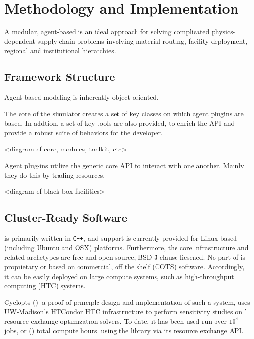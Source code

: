 \section{Methodology and Implementation}

A modular, agent-based is an ideal approach for solving complicated
physics-dependent supply chain problems involving material routing, facility
deployment, regional and institutional hierarchies.

\subsection{Framework Structure}

Agent-based modeling is inherently object oriented. 

The core of the simulator creates a set of key classes on which agent plugins 
are based. In addtion, a set of key tools are also provided, to enrich the API 
and provide a robust suite of behaviors for the developer.

<diagram of core, modules, toolkit, etc>

Agent plug-ins utilize the generic core API to interact with one another. 
Mainly they do this by trading resources. 

<diagram of black box facilities>

\subsection{Cluster-Ready Software}

\Cyclus is primarily written in \texttt{C++}, and support is currently provided
for Linux-based (including Ubuntu and OSX) platforms. Furthermore, the core
infrastructure and related archetypes are free and open-source, BSD-3-clause
licsened. No part of \Cyclus is proprietary or based on commercial, off the
shelf (COTS) software. Accordingly, it can be easily deployed on large compute
systems, such as high-throughput computing (HTC) systems.

Cyclopts (), a proof of principle design and implementation of such a
system, uses UW-Madison's HTCondor HTC infrastructure to perform sensitivity
studies on \Cyclus' resource exchange optimization solvers. To date, it has been
used run over $10^4$ jobs, or () total compute hours, using
the \Cyclus library via its resource exchange API.

